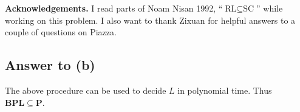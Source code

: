 \documentclass{article}
\renewcommand{\P}{\mathbf{P}}
\def \BPL{{\mathbf{BPL}}}
\begin{document}







\medskip
\noindent \textbf{Acknowledgements.}  I read parts of Noam Nisan 1992, ``$\text{RL} \subseteq \text{SC}$'' while working on this problem.
I also want to thank Zixuan for helpful answers to a couple of questions on Piazza.

\newpage
\subsection*{Answer to (b)}

The above procedure can be used to decide $L$ in polynomial time.  Thus $\BPL \subseteq \P$.
\end{document}
